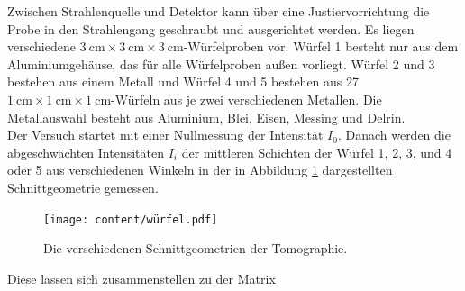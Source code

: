 Zwischen Strahlenquelle und Detektor kann über eine Justiervorrichtung die Probe in den Strahlengang geschraubt 
und ausgerichtet werden. Es liegen verschiedene 
$\SI{3}{\centi\meter} \times \SI{3}{\centi\meter} \times \SI{3}{\centi\meter}$-Würfelproben vor.
Würfel 1 besteht nur aus dem Aluminiumgehäuse, das für alle Würfelproben außen vorliegt.
Würfel 2 und 3 bestehen aus einem Metall und Würfel 4 und 5 bestehen aus 27 
$\SI{1}{\centi\meter} \times \SI{1}{\centi\meter} \times \SI{1}{\centi\meter}$-Würfeln aus je zwei verschiedenen Metallen.
Die Metallauswahl besteht aus Aluminium, Blei, Eisen, Messing und Delrin.\\

Der Versuch startet mit einer Nullmessung der Intensität $I_0$. Danach werden die abgeschwächten Intensitäten $I_i$
der mittleren Schichten der Würfel 1, 2, 3, und 4 oder 5 aus verschiedenen Winkeln in der in Abbildung \ref{fig:würfel}
dargestellten Schnittgeometrie gemessen.

\vspace{-5pt}
\begin{figure}[H]
    \centering
    \texttt{[image: content/würfel.pdf]}
    \vspace{-5pt}
    \caption{Die verschiedenen Schnittgeometrien der Tomographie.}
    \label{fig:würfel}
\end{figure}
\vspace{-5pt}

\vspace{5pt}
Diese lassen sich zusammenstellen zu der Matrix 
\vspace{5pt}

